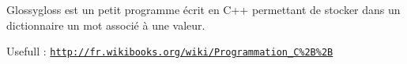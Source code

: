 Glossygloss est un petit programme écrit en C++ permettant de stocker dans un dictionnaire un mot associé à une valeur.

Usefull \-: \href{http://fr.wikibooks.org/wiki/Programmation_C%2B%2B}{\tt http\-://fr.\-wikibooks.\-org/wiki/\-Programmation\-\_\-\-C\%2\-B\%2\-B} 